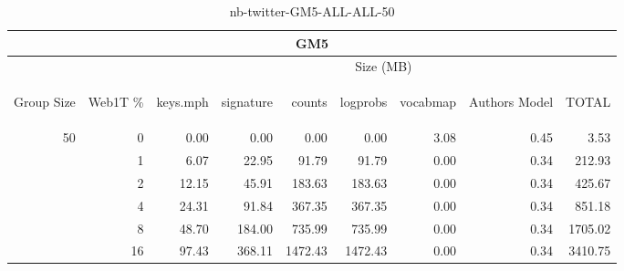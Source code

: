 \begin{center}
\begin{table}[htbp] 
 \begin{center}
\begin{tabular}{ | r | r | r | r | r | r | r | r | r |}
\hline
\multicolumn{9}{|c|}{GM5}\\
\hline
 & & \multicolumn{7}{|c|}{Size (MB)}\\ \cline{3-9}
\begin{sideways}Group Size\end{sideways} & \begin{sideways}Web1T \% \end{sideways} & \begin{sideways}keys.mph\end{sideways} & \begin{sideways}signature\end{sideways} & \begin{sideways}counts\end{sideways} & \begin{sideways}logprobs\end{sideways} & \begin{sideways}vocabmap\end{sideways} & \begin{sideways}Authors Model \end{sideways} & \begin{sideways}TOTAL\end{sideways}\\
\hline
\multirow{5}{*}{50}
 & 0 & 0.00 & 0.00 & 0.00 & 0.00 & 3.08 & 0.45 & 3.53\\ \cline{2-9}
 & 1 & 6.07 & 22.95 & 91.79 & 91.79 & 0.00 & 0.34 & 212.93\\ \cline{2-9}
 & 2 & 12.15 & 45.91 & 183.63 & 183.63 & 0.00 & 0.34 & 425.67\\ \cline{2-9}
 & 4 & 24.31 & 91.84 & 367.35 & 367.35 & 0.00 & 0.34 & 851.18\\ \cline{2-9}
 & 8 & 48.70 & 184.00 & 735.99 & 735.99 & 0.00 & 0.34 & 1705.02\\ \cline{2-9}
 & 16 & 97.43 & 368.11 & 1472.43 & 1472.43 & 0.00 & 0.34 & 3410.75\\ \cline{2-9}
\hline
\end{tabular}
\caption{nb-twitter-GM5-ALL-ALL-50}
\label{table:nb-twitter-GM5-ALL-ALL-50}
\end{center}
 \end{table}
\end{center}

